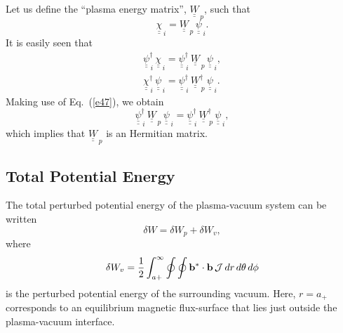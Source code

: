 \documentclass[12pt,prb,aps]{revtex4-1}
\begin{document}
Let us define the ``plasma energy matrix'', $\underline{\underline{W}}_{\,p}$, such that 
\begin{equation}\label{e48}
\underline{\underline{\chi}}_{\,i} = \underline{\underline{W}}_{\,p}\,\underline{\underline{\psi}}_{\,i}.
\end{equation}
 It is easily seen that
 \begin{align}
 \underline{\underline{\psi}}^{\dag}_{\,i}\,\underline{\underline{\chi}}_{\,i}= \underline{\underline{\psi}}^{\dag}_{\,i}\,\underline{\underline{W}}_{\,p}\,
 \underline{\underline{\psi}}_{\,i},\\[0.5ex]
 \underline{\underline{\chi}}^{\dag}_{\,i}\,\underline{\underline{\psi}}_{\,i}= \underline{\underline{\psi}}^{\dag}_{\,i}\,\underline{\underline{W}}_{\,p}^{\dag}\,
 \underline{\underline{\psi}}_{\,i}.
 \end{align}
 Making use of Eq.~(\ref{e47}), we obtain
 \begin{equation}
 \underline{\underline{\psi}}^{\dag}_{\,i}\,\underline{\underline{W}}_{\,p}\,
 \underline{\underline{\psi}}_{\,i}=
 \underline{\underline{\psi}}^{\dag}_{\,i}\,\underline{\underline{W}}_{\,p}^{\dag}\,
 \underline{\underline{\psi}}_{\,i},
 \end{equation}
 which implies that $\underline{\underline{W}}_{\,p}$ is an Hermitian matrix. 
  
\subsection{Total Potential Energy}
The total perturbed potential energy of the plasma-vacuum system can be written\,\cite{freidberg,ideal}
\begin{equation}\label{e79}
\delta W= \delta W_p + \delta W_v,
\end{equation}
where
\begin{equation}
\delta W_v = \frac{1}{2}\int_{a+}^\infty\oint\oint {\bf b}^\ast\cdot{\bf b} \,{\cal J}\,dr\,d\theta\,d\phi
\end{equation}
is the perturbed potential energy of the surrounding vacuum.\cite{freidberg,ideal} Here, $r=a_+$ corresponds to an equilibrium magnetic flux-surface that lies just outside the plasma-vacuum interface. 
\end{document}
